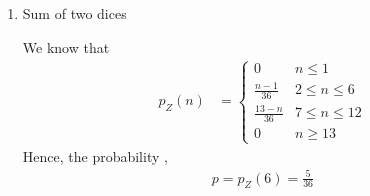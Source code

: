 \documentclass[journal,12pt,onecolumn]{IEEEtran}
\theoremstyle{remark}
\begin{document}
\begin{enumerate}[label={(\alph*)}]
\item \begin{table}[!htb]
	
	\caption{Sum of two dices}
\end{table} 
We know that 
\begin{align}
  p_Z(n) &= 
  \begin{cases}
  0 & n \le 1
  \\
  \frac{n-1}{36} &  2 \le n \le  6
  \\
  \frac{13-n}{36} & 7 \le n \le 12
  \\
  0 & n \ge 13
  \end{cases}
  \end{align}
Hence, the probability ,
\begin{align}
	p = p_Z(6) = \frac{5}{36}
\end{align}

\end{enumerate}
\end{document}
